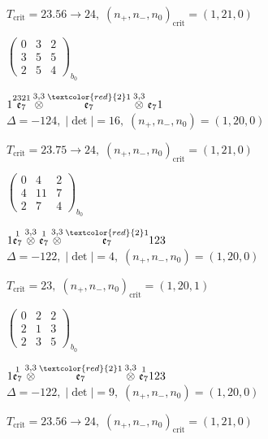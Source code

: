 \documentclass[10pt]{article}
\begin{document}
\hspace{1em}$T_{\text{crit}}=23.56 \to 24,\; (n_+,n_-,n_0)_{\text{crit}}=(1,21,0)$

\hspace{2em}$\left(\begin{smallmatrix}0 & 3 & 2 \\ 3 & 5 & 5 \\ 2 & 5 & 4\end{smallmatrix}\right)_{\!b_0}$

$1\overset{2321}{\mathfrak{e}_7}\overset{3,3}{\otimes}\overset{\textcolor{red}{2}1}{\mathfrak{e}_7}\overset{3,3}{\otimes}\mathfrak{e}_71$ \quad $\Delta=-124,\; |\det|=16,\; (n_+,n_-,n_0)=(1,20,0)$

\hspace{1em}$T_{\text{crit}}=23.75 \to 24,\; (n_+,n_-,n_0)_{\text{crit}}=(1,21,0)$

\hspace{2em}$\left(\begin{smallmatrix}0 & 4 & 2 \\ 4 & 11 & 7 \\ 2 & 7 & 4\end{smallmatrix}\right)_{\!b_0}$

\smallskip

$1\overset{1}{\mathfrak{e}_7}\overset{3,3}{\otimes}\overset{1}{\mathfrak{e}_7}\overset{3,3}{\otimes}\overset{\textcolor{red}{2}1}{\mathfrak{e}_7}123$ \quad $\Delta=-122,\; |\det|=4,\; (n_+,n_-,n_0)=(1,20,0)$

\hspace{1em}$T_{\text{crit}}=23,\; (n_+,n_-,n_0)_{\text{crit}}=(1,20,1)$

\hspace{2em}$\left(\begin{smallmatrix}0 & 2 & 2 \\ 2 & 1 & 3 \\ 2 & 3 & 5\end{smallmatrix}\right)_{\!b_0}$

$1\overset{1}{\mathfrak{e}_7}\overset{3,3}{\otimes}\overset{\textcolor{red}{2}1}{\mathfrak{e}_7}\overset{3,3}{\otimes}\overset{1}{\mathfrak{e}_7}123$ \quad $\Delta=-122,\; |\det|=9,\; (n_+,n_-,n_0)=(1,20,0)$

\hspace{1em}$T_{\text{crit}}=23.56 \to 24,\; (n_+,n_-,n_0)_{\text{crit}}=(1,21,0)$
\end{document}
